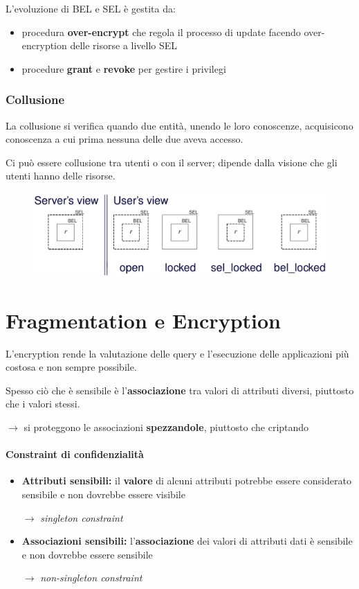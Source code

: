 \documentclass{report}
\begin{document}
\newpage
L'evoluzione di BEL e SEL è gestita da:
\begin{itemize}
    \item procedura \textbf{over-encrypt} che regola il processo di update facendo over-encryption delle risorse a livello SEL 
    \item procedure \textbf{grant} e \textbf{revoke} per gestire i privilegi
\end{itemize}

\subsection{Collusione}
La collusione si verifica quando due entità, unendo le loro conoscenze, acquisicono conoscenza a cui 
prima nessuna delle due aveva accesso.

\noindent Ci può essere collusione tra utenti o con il server; dipende dalla visione che gli utenti hanno delle risorse.

\begin{figure}[ht]
    \centering
    \includegraphics[width=0.7\linewidth]{images/encryption/views.png}
\end{figure}

\chapter{Fragmentation e Encryption}
L'encryption rende la valutazione delle query e l'esecuzione delle applicazioni 
più costosa e non sempre possibile.

Spesso ciò che è sensibile è l'\textbf{associazione} tra valori di attributi diversi, 
piuttosto che i valori stessi.

$\rightarrow$ si proteggono le associazioni \textbf{spezzandole}, piuttosto che criptando

\subsubsection{Constraint di confidenzialità}
\begin{itemize}
    \item \textbf{Attributi sensibili:} il \textbf{valore} di alcuni attributi potrebbe essere considerato sensibile e non dovrebbe essere visibile 
    
    $\rightarrow$ \textit{singleton constraint}
    \item \textbf{Associazioni sensibili:} l'\textbf{associazione} dei valori di attributi dati è sensibile e non dovrebbe essere sensibile 
    
    $\rightarrow$ \textit{non-singleton constraint}
\end{itemize}
\end{document}
